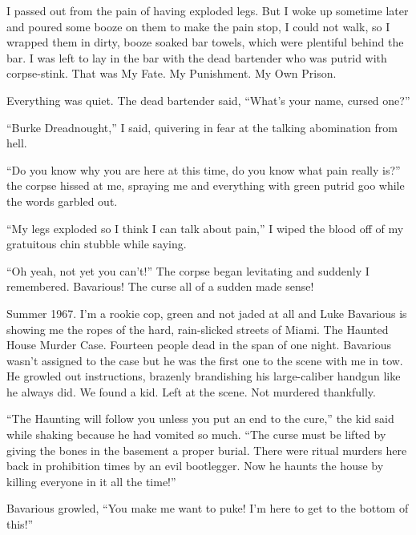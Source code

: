 I passed out from the pain of having exploded legs. But I woke up
sometime later and poured some booze on them to make the pain stop,
I could not walk, so I wrapped them in dirty, booze soaked bar
towels, which were plentiful behind the bar. I was left to lay in
the bar with the dead bartender who was putrid with corpse-stink.
That was My Fate. My Punishment. My Own Prison.



Everything was quiet. The dead bartender said, ``What's your name,
cursed one?''



``Burke Dreadnought,'' I said, quivering in fear at the talking
abomination from hell.



``Do you know why you are here at this time, do you know what pain
really is?'' the corpse hissed at me, spraying me and everything
with green putrid goo while the words garbled out.



``My legs exploded so I think I can talk about pain,'' I wiped the
blood off of my gratuitous chin stubble while saying.



``Oh yeah, not yet you can't!'' The corpse began levitating and
suddenly I remembered. Bavarious! The curse all of a sudden made
sense!



Summer 1967. I'm a rookie cop, green and not jaded at all and Luke
Bavarious is showing me the ropes of the hard, rain-slicked streets
of Miami. The Haunted House Murder Case. Fourteen people dead in
the span of one night. Bavarious wasn't assigned to the case but he
was the first one to the scene with me in tow. He growled out
instructions, brazenly brandishing his large-caliber handgun like
he always did. We found a kid. Left at the scene. Not murdered
thankfully.



``The Haunting will follow you unless you put an end to the cure,''
the kid said while shaking because he had vomited so much. ``The
curse must be lifted by giving the bones in the basement a proper
burial. There were ritual murders here back in prohibition times by
an evil bootlegger. Now he haunts the house by killing everyone in
it all the time!''



Bavarious growled, ``You make me want to puke! I'm here to get to
the bottom of this!''



